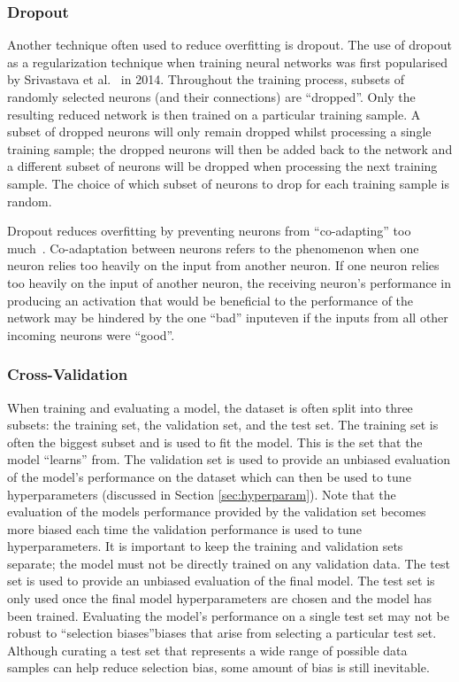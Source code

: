 \subsubsection{Dropout}

Another technique often used to reduce overfitting is dropout. The use of dropout as a regularization technique when training neural networks was first popularised by Srivastava et al.~\cite{dropout} in 2014. Throughout the training process, subsets of randomly selected neurons (and their connections) are ``dropped''. Only the resulting reduced network is then trained on a particular training sample. A subset of dropped neurons will only remain dropped whilst processing a single training sample; the dropped neurons will then be added back to the network and a different subset of neurons will be dropped when processing the next training sample. The choice of which subset of neurons to drop for each training sample is random. 

Dropout reduces overfitting by preventing neurons from ``co-adapting'' too much~\cite{dropout}. Co-adaptation between neurons refers to the phenomenon when one neuron relies too heavily on the input from another neuron. If one neuron relies too heavily on the input of another neuron, the receiving neuron's performance in producing an activation that would be beneficial to the performance of the network may be hindered by the one ``bad'' input\textemdash even if the inputs from all other incoming neurons were ``good''.

\subsubsection{Cross-Validation}

When training and evaluating a model, the dataset is often split into three subsets: the training set, the validation set, and the test set. The training set is often the biggest subset and is used to fit the model. This is the set that the model ``learns'' from. The validation set is used to provide an unbiased evaluation of the model's performance on the dataset which can then be used to tune hyperparameters (discussed in Section \ref{sec:hyperparam}). Note that the evaluation of the models performance provided by the validation set becomes more biased each time the validation performance is used to tune hyperparameters. It is important to keep the training and validation sets separate; the model must not be directly trained on any validation data. The test set is used to provide an unbiased evaluation of the final model. The test set is only used once the final model hyperparameters are chosen and the model has been trained. Evaluating the model's performance on a single test set may not be robust to ``selection biases''\textemdash biases that arise from selecting a particular test set. Although curating a test set that represents a wide range of possible data samples can help reduce selection bias, some amount of bias is still inevitable.

